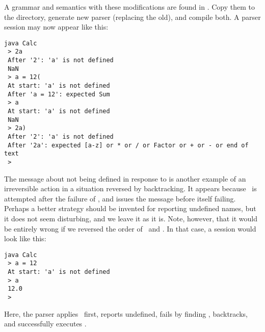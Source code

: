 A grammar and semantics with these modifications are found in .
Copy them to the  directory, generate new parser (replacing the old), and compile both.
A parser session may now appear like this:

\small
\begin{Verbatim}[samepage=true,xleftmargin=15mm,baselinestretch=0.8]
 java Calc
 > 2a
 After '2': 'a' is not defined
 NaN
 > a = 12(
 At start: 'a' is not defined 
 After 'a = 12': expected Sum
 > a
 At start: 'a' is not defined 
 NaN
 > 2a)
 After '2': 'a' is not defined
 After '2a': expected [a-z] or * or / or Factor or + or - or end of text
 >
\end{Verbatim}
\normalsize

The message about  not being defined in response to  
is another example of an irreversible action
in a situation reversed by backtracking.
It appears because \Print\ is attempted after the failure of \Store,
and issues the message before itself failing.
Perhaps a better strategy should be invented for reporting undefined names,
but it does not seem disturbing, and we leave it as it is.
Note, however, that it would be entirely wrong if we reversed the order of \Store\ and \Print.
In that case, a session would look like this:

\small
\begin{Verbatim}[samepage=true,xleftmargin=15mm,baselinestretch=0.8]
 java Calc
 > a = 12
 At start: 'a' is not defined
 > a
 12.0
 > 
\end{Verbatim}
\normalsize

Here, the parser applies \Print\ first, reports  undefined, fails by finding ,
backtracks, and successfully executes \Store.


